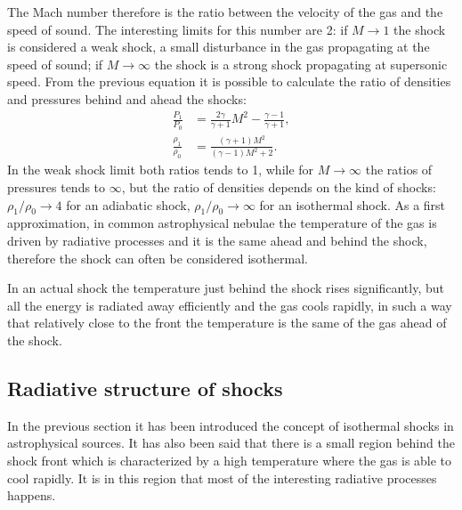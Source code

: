 \documentclass[../main.tex]{subfiles}
\begin{document}
The Mach number therefore is the ratio between the velocity of the gas and the speed of sound.
The interesting limits for this number are 2: if $M\to 1$ the shock is considered a weak shock, a small disturbance in the gas propagating at the speed of sound; if $M\to\infty$ the shock is a strong shock propagating at supersonic speed.
From the previous equation it is possible to calculate the ratio of densities and pressures behind and ahead the shocks:
\begin{align}
    \label{eq:ratios1}
    \frac{P_1}{P_0} & = \frac{2\gamma}{\gamma+1}M^2 -\frac{\gamma-1}{\gamma+1},\\
    \label{eq:ratios2}
    \frac{\rho_1}{\rho_0} & = \frac{(\gamma+1)M^2}{(\gamma-1)M^2+2}.
\end{align}
In the weak shock limit both ratios tends to 1, while for $M\to\infty$ the ratios of pressures tends to $\infty$, but the ratio of densities depends on the kind of shocks: $\rho_1/\rho_0 \to 4$ for an adiabatic shock, $\rho_1/\rho_0 \to \infty$ for an isothermal shock.
As a first approximation, in common astrophysical nebulae the temperature of the gas is driven by radiative processes and it is the same ahead and behind the shock, therefore the shock can often be considered isothermal.

In an actual shock the temperature just behind the shock rises significantly, but all the energy is radiated away efficiently and the gas cools rapidly, in such a way that relatively close to the front the temperature is the same of the gas ahead of the shock.

\subsection{Radiative structure of shocks}

In the previous section it has been introduced the concept of isothermal shocks in astrophysical sources.
It has also been said that there is a small region behind the shock front which is characterized by a high temperature where the gas is able to cool rapidly.
It is in this region that most of the interesting radiative processes happens.
\end{document}
